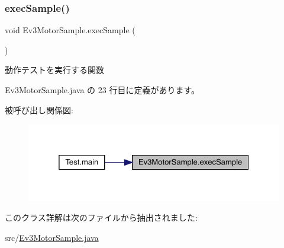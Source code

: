 \subsubsection{\texorpdfstring{execSample()}{execSample()}}
{\footnotesize\ttfamily void Ev3\+Motor\+Sample.\+exec\+Sample (\begin{DoxyParamCaption}{ }\end{DoxyParamCaption})\hspace{0.3cm}{\ttfamily [inline]}}

動作テストを実行する関数 

 Ev3\+Motor\+Sample.\+java の 23 行目に定義があります。

被呼び出し関係図\+:\nopagebreak
\begin{figure}[H]
\begin{center}
\leavevmode
\includegraphics[width=325pt]{de/d59/class_ev3_motor_sample_a771d6010d23dde59b21aa0f4d06aaf18_icgraph}
\end{center}
\end{figure}


このクラス詳解は次のファイルから抽出されました\+:\begin{DoxyCompactItemize}
\item 
src/\mbox{\hyperlink{_ev3_motor_sample_8java}{Ev3\+Motor\+Sample.\+java}}\end{DoxyCompactItemize}
